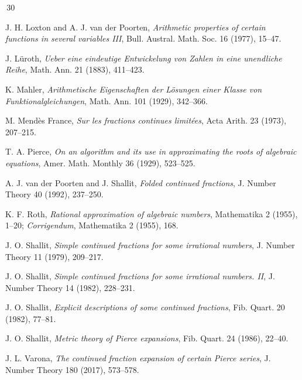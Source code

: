 \documentclass[12pt,a4paper]{amsart}
\theoremstyle{definition}
\numberwithin{equation}{section}
\begin{document}
\begin{thebibliography}{\,30\,}

J. H. Loxton and A. J. van der Poorten, 
\textit{Arithmetic properties of certain
functions in several variables III}, 
Bull. Austral. Math. Soc. {16} (1977), 15--47. 

J. L\"uroth, 
\textit{Ueber eine eindeutige Entwickelung von Zahlen in eine unendliche Reihe}, 
Math. Ann. {21} (1883), 411--423.

K. Mahler, 
\textit{Arithmetische Eigenschaften der L\"osungen einer Klasse
von Funktionalgleichungen}, 
Math. Ann. {101} (1929), 342--366. 

M. Mend\`es France, 
\textit{Sur les fractions continues limit\'ees}, 
Acta Arith. {23} (1973), 207--215.


T. A. Pierce, 
\textit{On an algorithm and its use in approximating the roots of algebraic equations}, 
Amer. Math. Monthly {36} (1929), 523--525.

A. J. van der Poorten and J. Shallit, 
\textit{Folded continued fractions}, 
J. Number Theory {40} (1992), 237--250.

K. F. Roth, 
\textit{Rational approximation of algebraic numbers}, 
Mathematika {2} (1955), 1--20; 
\textit{Corrigendum}, Mathematika {2} (1955), 168.

J. O. Shallit, 
\textit{Simple continued fractions for some irrational numbers}, 
J. Number Theory {11} (1979), 209--217.

J. O. Shallit, 
\textit{Simple continued fractions for some irrational numbers. II}, 
J. Number Theory {14} (1982), 228--231.

J. O. Shallit, 
\textit{Explicit descriptions of some continued fractions},
Fib. Quart. {20} (1982), 77--81.

J. O. Shallit, 
\textit{Metric theory of Pierce expansions}, 
Fib. Quart. {24} (1986), 22--40. 


J. L. Varona, 
\textit{The continued fraction expansion of certain Pierce series}, 
J. Number Theory {180} (2017), 573--578. 



\end{thebibliography}

\end{document}
